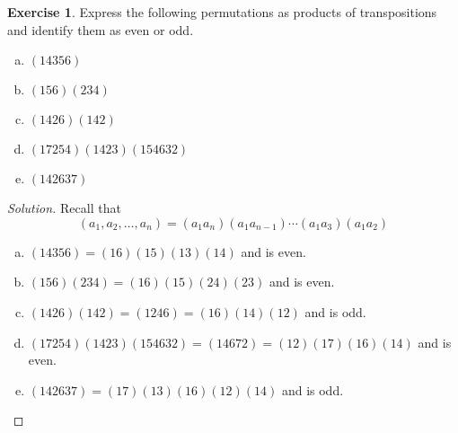 \documentclass{article}
\theoremstyle{definition}
\newtheorem{theorem}{Exercise}[section]
\theoremstyle{remark}
\begin{document}
	\begin{theorem}
		Express the following permutations as products of transpositions and identify them as even or odd. 
		\begin{multicols}{3}
		\begin{enumerate}[(a)]
			\item $(14356)$
			\item $(156)(234)$
			\item $(1426)(142)$
			\item $(17254)(1423)(154632)$
			\item $(142637)$
		\end{enumerate}
		\end{multicols}
	\end{theorem}
	\begin{proof}[Solution]
		Recall that \[\left(a_1,a_2,\ldots,a_n\right)=\left(a_1a_n\right)\left(a_1a_{n-1}\right)\cdots\left(a_1a_3\right)\left(a_1a_2\right)\]
		\begin{multicols}{2}
		\begin{enumerate}[(a)]
			\item $(14356)=(16)(15)(13)(14)$ and is even.
			\item $(156)(234)=(16)(15)(24)(23)$ and is even.
			\item $(1426)(142)=(1246)=(16)(14)(12)$ and is odd.
			\item $(17254)(1423)(154632)=(14672)=(12)(17)(16)(14)$ and is even.
			\item $(142637)=(17)(13)(16)(12)(14)$ and is odd.\qedhere
		\end{enumerate}
		\end{multicols}
	\end{proof}
\end{document}
